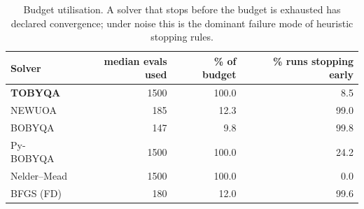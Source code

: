 \begin{table}[t]\centering\small
\caption{Budget utilisation. A solver that stops before the budget is exhausted has declared convergence; under noise this is the dominant failure mode of heuristic stopping rules.}
\label{tab:budget}
\begin{tabular}{lrrr}\toprule
Solver & median evals used & \% of budget & \% runs stopping early \\\midrule
\textbf{TOBYQA} & 1500 & 100.0 & 8.5 \\
NEWUOA & 185 & 12.3 & 99.0 \\
BOBYQA & 147 & 9.8 & 99.8 \\
Py-BOBYQA & 1500 & 100.0 & 24.2 \\
Nelder--Mead & 1500 & 100.0 & 0.0 \\
BFGS (FD) & 180 & 12.0 & 99.6 \\
\bottomrule\end{tabular}\end{table}